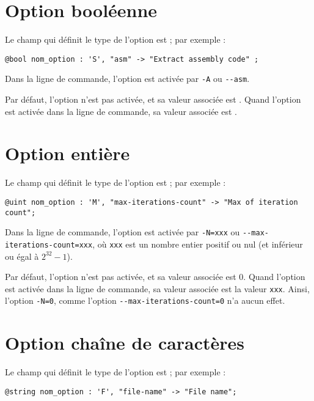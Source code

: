 \section{Option booléenne}

Le champ qui définit le type de l'option est  ; par exemple :
\begin{lstlisting}[language=galgas]
  @bool nom_option : 'S', "asm" -> "Extract assembly code" ;
\end{lstlisting}

Dans la ligne de commande, l'option est activée par \texttt{-A} ou \texttt{-{}-asm}.

Par défaut, l'option n'est pas activée, et sa valeur associée est . Quand l'option est activée dans la ligne de commande, sa valeur associée est .








\section{Option entière}

Le champ qui définit le type de l'option est  ; par exemple :
\begin{lstlisting}[language=galgas]
  @uint nom_option : 'M', "max-iterations-count" -> "Max of iteration count";
\end{lstlisting}

Dans la ligne de commande, l'option est activée par \texttt{-N=xxx} ou \texttt{-{}-max-iterations-count=xxx}, où \texttt{xxx} est un nombre entier positif ou nul (et inférieur ou égal à $2^{32}-1$).

Par défaut, l'option n'est pas activée, et sa valeur associée est $0$. Quand l'option est activée dans la ligne de commande, sa valeur associée est la valeur \texttt{xxx}. Ainsi, l'option \texttt{-N=0}, comme l'option \texttt{-{}-max-iterations-count=0} n'a aucun effet.










\section{Option chaîne de caractères}

Le champ qui définit le type de l'option est  ; par exemple :
\begin{lstlisting}[language=galgas]
  @string nom_option : 'F', "file-name" -> "File name";
\end{lstlisting}

